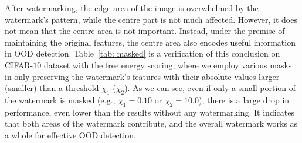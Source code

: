 \documentclass{article}
\begin{document}
{After watermarking, the edge area of the image is overwhelmed by the watermark's pattern, while the centre part is not much affected. However, it does not mean that the centre area is not important. Instead, under the premise of maintaining the original features, the centre area also encodes useful information in OOD detection. Table~\ref{tab: masked} is a verification of this conclusion on CIFAR-$10$ dataset with the free energy scoring, where we employ various masks in only preserving the watermark's features with their absolute values larger (smaller) than a threshold $\chi_1$ ($\chi_2$). As we can see, even if only a small portion of the watermark is masked (e.g., $\chi_1=0.10$ or $\chi_2=10.0$), there is a large drop in performance, even lower than the results without any watermarking. It indicates that both areas of the watermark contribute, and the overall watermark works as a whole for effective OOD detection. }
\end{document}
